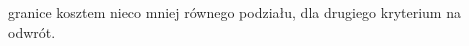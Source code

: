 granice kosztem nieco mniej równego podziału, dla drugiego kryterium na odwrót.
\begin{figure}[h]
\centering
\begin{subfigure}{.33\textwidth}
    \centering
    \caption[short]{}
\end{subfigure}%
\begin{subfigure}{.33\textwidth}
    \centering

\end{subfigure}
\end{figure}
